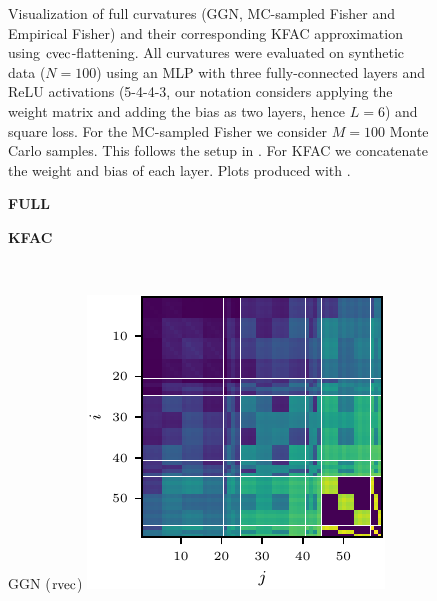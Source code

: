 \begin{figure}[t!]
\begin{minipage}[t]{0.485\linewidth}
  \end{minipage}
  \caption{Visualization of full curvatures (GGN, MC-sampled Fisher and Empirical Fisher) and their corresponding KFAC approximation using $\operatorname{cvec}$-flattening. All curvatures were evaluated on synthetic data ($N = 100$) using an MLP with three fully-connected layers and ReLU activations (5-4-4-3, our notation considers applying the weight matrix and adding the bias as two layers, hence $L=6$) and square loss. For the MC-sampled Fisher we consider $M = 100$ Monte Carlo samples. This follows the setup in . For KFAC we concatenate the weight and bias of each layer. 
    Plots produced with .}
    \label{fig:kfac-full-comparison}
\end{figure}

\begin{figure}[t!]
  \centering
  \begin{minipage}[t]{0.485\linewidth}
    \centering
    \textbf{FULL}
  \end{minipage}
  \hfill
  \begin{minipage}[t]{0.485\linewidth}
    \centering
    \textbf{KFAC}
  \end{minipage}
  \\
  \begin{minipage}[t]{0.485\linewidth}
    \centering
     GGN ($\operatorname{rvec}$)\vspace{1ex}
    \includegraphics[width=0.8\linewidth]{../kfs/plots/synthetic_rvec_ggn_full.pdf}
  \end{minipage}
  \hfill

\end{figure}
